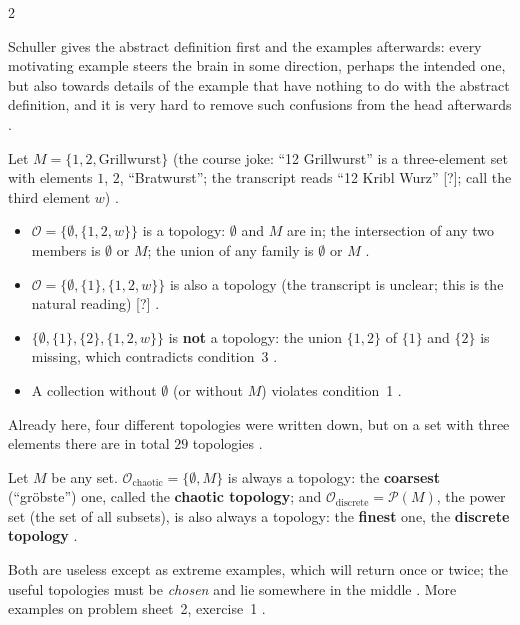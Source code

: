 \begin{paracol}{2}
\begin{aside}
Schuller gives the abstract definition first and the examples afterwards: every motivating example steers the brain
in some direction, perhaps the intended one, but also towards details of the example that have nothing to do with the
abstract definition, and it is very hard to remove such confusions from the head afterwards
.
\end{aside}

\begin{example}\label{ex:tm-three}
Let $M=\{1,2,\text{Grillwurst}\}$ (the course joke: ``12 Grillwurst'' is a three-element set with elements
$1$, $2$, ``Bratwurst''; the transcript reads ``12 Kribl Wurz'' [?]; call the third element $w$) .
\begin{itemize}
  \item $\mathcal O=\{\emptyset,\{1,2,w\}\}$ is a topology: $\emptyset$ and $M$ are in; the intersection of any two
        members is $\emptyset$ or $M$; the union of any family is $\emptyset$ or $M$ .
  \item $\mathcal O=\{\emptyset,\{1\},\{1,2,w\}\}$ is also a topology (the transcript is unclear; this is the natural
        reading) [?] .
  \item $\{\emptyset,\{1\},\{2\},\{1,2,w\}\}$ is \textbf{not} a topology: the union $\{1,2\}$ of $\{1\}$ and $\{2\}$ is
        missing, which contradicts condition~3 .
  \item A collection without $\emptyset$ (or without $M$) violates condition~1 .
\end{itemize}
Already here, four different topologies were written down, but on a set with three elements there are in total $29$
topologies .
\end{example}

\begin{definition}\label{def:tm-extreme}
Let $M$ be any set. $\mathcal O_{\mathrm{chaotic}}=\{\emptyset,M\}$ is always a topology: the \textbf{coarsest}
(``gröbste'') one, called the \textbf{chaotic topology}; and $\mathcal O_{\mathrm{discrete}}=\mathcal P(M)$, the power set
(the set of all subsets), is also always a topology: the \textbf{finest} one, the \textbf{discrete topology}
.
\end{definition}
Both are useless except as extreme examples, which will return once or twice; the useful topologies must be \emph{chosen}
and lie somewhere in the middle . More examples on problem sheet~2, exercise~1
.


\end{paracol}
